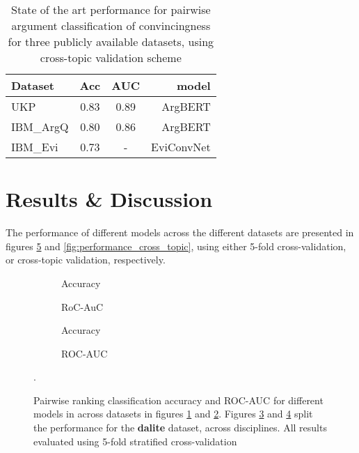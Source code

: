 \documentclass[runningheads]{llncs}
\begin{document}
\begin{table} 
\centering\begin{tabular}{l|*{2}{c}r}
	Dataset     & Acc & AUC & model  	   \\
	\hline
	UKP 		& 0.83 & 0.89 & ArgBERT\cite{toledo_automatic_2019}    \\
	IBM\_ArgQ   & 0.80 & 0.86 & ArgBERT\cite{toledo_automatic_2019}    \\
	IBM\_Evi    & 0.73 & - 	  & EviConvNet\cite{gleize_are_2019} \\
\end{tabular}
\caption{State of the art performance for pairwise argument classification of 
convincingness for three publicly available datasets, using cross-topic 
validation scheme}
\label{tab:sota}
\end{table}

\section{Results \& Discussion}

The performance of different models across the different datasets are presented 
in figures \ref{fig:performance_k_fold} and \ref{fig:performance_cross_topic}, 
using either 5-fold cross-validation, or cross-topic validation, respectively. 

\begin{figure}
	\begin{subfigure}[t]{0.5\linewidth}
		\centering
		\scalebox{0.5}{}
		\caption{Accuracy}
		\label{fig:acc_kfold}
	\end{subfigure}%
	\qquad
	\begin{subfigure}[t]{0.5\linewidth}
		\centering
		\scalebox{0.5}{}
		\caption{RoC-AuC}
		\label{fig:AUC_kfold}
	\end{subfigure}
	
	\begin{subfigure}[t]{0.5\linewidth}
		\centering
		\scalebox{0.5}{}
		\caption{Accuracy}
		\label{fig:acc_dalite_kfold}
	\end{subfigure}%
	\qquad
	\begin{subfigure}[t]{0.5\linewidth}
		\centering
		\scalebox{0.5}{}
		\caption{ROC-AUC}
		\label{fig:AUC_dalite_kfold}
	\end{subfigure}	
	\caption{Pairwise ranking classification accuracy and ROC-AUC for 
		different models in across datasets in figures \ref{fig:acc_kfold} and 
		\ref{fig:AUC_kfold}. Figures \ref{fig:acc_dalite_kfold} and 
		\ref{fig:AUC_dalite_kfold} split the performance for the 
		\textbf{dalite} 
		dataset, across disciplines. All results evaluated using 5-fold 
		stratified 
		cross-validation}.
	\label{fig:performance_k_fold}
\end{figure}
\end{document}
